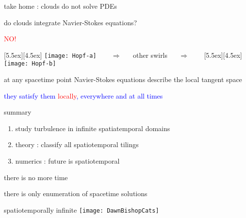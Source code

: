 \begin{frame}{take home : clouds do not solve PDEs}

do clouds integrate Navier-Stokes equations?

\begin{center}
\centerline{\textcolor{red}{\Huge NO!}}

\begin{minipage}[t]{\textwidth}
	\begin{center}
\centerline{
\raisebox{-4.0ex}[5.5ex][4.5ex]
		 {\texttt{[image: Hopf-a]}}
~~~ $\Longrightarrow$ ~~ {other swirls} ~~ $\Longrightarrow$ ~~~
	\raisebox{-4.0ex}[5.5ex][4.5ex]
		 {\texttt{[image: Hopf-b]}}
          }
	\end{center}
\end{minipage}
\end{center}

at any spacetime point Navier-Stokes equations describe the local tangent space

\bigskip

\centerline{
\textcolor{blue}{they satisfy them \textcolor{red}{\large locally}, everywhere and at all times}
}
\end{frame}


\begin{frame}{summary}
\begin{enumerate}
              \item
study turbulence in infinite spatiatemporal domains
              \item
theory : classify all spatiotemporal tilings
              \item
numerics : future is spatiotemporal
\end{enumerate}

\vfill

there is no more time

\medskip

there is only enumeration of spacetime solutions
\end{frame}

\begin{frame}{spatiotemporally infinite \catlatt}
\hfill\texttt{[image: DawnBishopCats]}
\end{frame}



